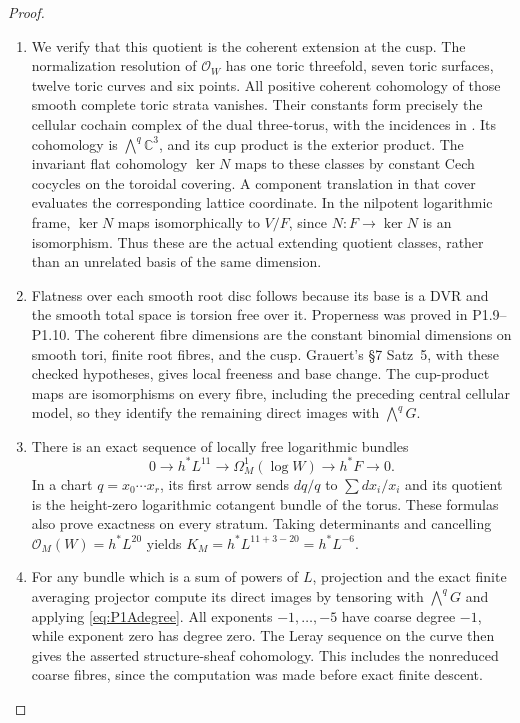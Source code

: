 \documentclass[11pt,a4paper]{article}
\theoremstyle{definition}
\begin{document}
\begin{proof}
\begin{enumerate}[label=\arabic*.]
\item We verify that this quotient is the coherent extension at the cusp.
The normalization resolution of $\mathcal O_W$ has one toric
threefold, seven toric surfaces, twelve toric curves and six points.
All positive coherent cohomology of those smooth complete toric
strata vanishes. Their constants form precisely the cellular
cochain complex of the dual three-torus, with the incidences in
. Its cohomology is
$\bigwedge^q\mathbb C^3$, and its cup product is the exterior product.
The invariant flat cohomology $\ker N$ maps to these classes by
constant Cech cocycles on the toroidal covering. A component
translation in that cover evaluates the corresponding lattice
coordinate. In the nilpotent logarithmic frame, $\ker N$ maps
isomorphically to $V/F$, since $N:F\to\ker N$ is an isomorphism.
Thus these are the actual extending quotient classes, rather than
an unrelated basis of the same dimension.

\item Flatness over each smooth root disc follows because its base is a
DVR and the smooth total space is torsion free over it. Properness
was proved in P1.9--P1.10. The coherent fibre dimensions are the
constant binomial dimensions on smooth tori, finite root fibres,
and the cusp. Grauert's \S7 Satz~5, with these checked hypotheses,
gives local freeness and base change. The cup-product maps are
isomorphisms on every fibre, including the preceding central
cellular model, so they identify the remaining direct images with
$\bigwedge^qG$.

\item There is an exact sequence of locally free logarithmic bundles
\begin{equation}\label{eq:P1Alogcotangent}
0\longrightarrow h^*L^{11}\longrightarrow\Omega_M^1(\log W)
 \longrightarrow h^*F\longrightarrow0.
\end{equation}
In a chart $q=x_0\cdots x_r$, its first arrow sends
$dq/q$ to $\sum dx_i/x_i$ and its quotient is the height-zero
logarithmic cotangent bundle of the torus. These formulas also
prove exactness on every stratum. Taking determinants and
cancelling $\mathcal O_M(W)=h^*L^{20}$ yields
$K_M=h^*L^{11+3-20}=h^*L^{-6}$.

\item For any bundle which is a sum of powers of $L$, projection and
the exact finite averaging projector compute its direct images
by tensoring with $\bigwedge^qG$ and applying
\eqref{eq:P1Adegree}. All exponents $-1,\ldots,-5$ have coarse
degree $-1$, while exponent zero has degree zero. The Leray
sequence on the curve then gives the asserted structure-sheaf
cohomology. This includes the nonreduced coarse fibres, since
the computation was made before exact finite descent.

\end{enumerate}
\end{proof}
\end{document}
